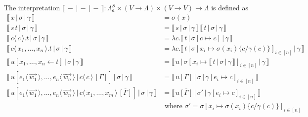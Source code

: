 \documentclass[a4paper,UKenglish,cleveref, autoref]{lipics-v2019}
\newcommand{\FALC}{\Lambda^{S}_{a}}
\newcommand{\abs}[2]{\lambda #1 . #2}
\newcommand{\app}[2]{#1 \, #2}
\newcommand{\fake}[3]{#1 \langle \, #2 \, \rangle . #3}
\newcommand{\share}[3]{#1 [#2 \leftarrow #3]}
\newcommand{\dist}[5]{#1 [ #2 \, \vert \, \fakedist{#4}{#5} \, #3 ]}
\newcommand{\fakedist}[2]{#1 \langle \, #2 \, \rangle}
\newcommand{\sub}[3]{#1 \{ #2 / #3 \}}
\newcommand{\trans}[1]{\llbracket \, #1 \, \rrbracket}
\newcommand{\tranclos}[1]{\| #1 \|}
\newcommand{\readbackwmap}[3]{\llbracket \, #1 \, \vert \, #2 \, \vert \, #3  \, \rrbracket }
\begin{document}
\begin{definition}
\label{def:readback}
The interpretation $\readbackwmap{-}{-}{-} : \FALC \times (V \rightarrow \Lambda) \times (V \rightarrow V) \rightarrow \Lambda$ is defined as
\begingroup
\allowdisplaybreaks
\begin{align*}
	\readbackwmap{x}{\sigma}{\gamma} &= \sigma(x) \\[0.2cm]
	\readbackwmap{\app{s}{t}}{\sigma}{\gamma} &= \app{\readbackwmap{s}{\sigma}{\gamma}}{\readbackwmap{t}{\sigma}{\gamma}} \\[0.2cm]
	\readbackwmap{\fake{c}{c}{t}}{\sigma}{\gamma} &= \abs{c}{\readbackwmap{t}{\sigma[c \mapsto c]}{\gamma}} \\[0.2cm]
	\readbackwmap{\fake{c}{x_{1}, \dots, x_{n}}{t}}{\sigma}{\gamma} &= \abs{c}{\readbackwmap{t}{\sigma[x_{i} \mapsto \sigma(x_{i}) \sub{}{c}{\gamma(c)}]_{i \in [n]}}{\gamma}} \\[0.2cm]
	\readbackwmap{\share{u}{x_{1}, \dots, x_{n}}{t}}{\sigma}{\gamma} &= \readbackwmap{u}{\sigma[x_{i} \mapsto \readbackwmap{t}{\sigma}{\gamma}]_{i \in [n]}}{\gamma} \\[0.2cm]
	\readbackwmap{\dist{u}{\fakedist{e_{1}}{\vec{w_{1}}}, \dots, \fakedist{e_{n}}{\vec{w_{n}}}}{\overline{[\Gamma]}}{c}{c}}{\sigma}{\gamma} &= \readbackwmap{u \overline{[\Gamma]}}{\sigma}{\gamma[e_{i} \mapsto c]_{i \in [n]}} \\[0.2cm]
	\readbackwmap{\dist{u}{\fakedist{e_{1}}{\vec{w_{1}}}, \dots, \fakedist{e_{n}}{\vec{w_{n}}}}{\overline{[\Gamma]}}{c}{x_{1}, \dots, x_{m}}}{\sigma}{\gamma} &= \readbackwmap{u \overline{[\Gamma]}}{\sigma'}{\gamma[e_{i} \mapsto c]_{i \in [n]}} \\
	 & \text{ where } \sigma' = \sigma[x_{i} \mapsto \sigma(x_{i}) \sub{}{c}{\gamma(c)}]_{i \in [n]} \\
\end{align*}
\endgroup

\end{definition}
\end{document}
